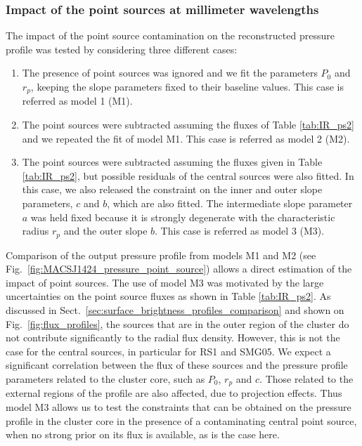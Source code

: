 \documentclass[twocolumn,traditabstract]{aa}
\begin{document}
\subsubsection{Impact of the point sources at millimeter wavelengths}
The impact of the point source contamination on the reconstructed pressure profile was tested by considering three different cases: 
\begin{enumerate}
\item The presence of point sources was ignored and we fit the parameters $P_0$ and $r_p$, keeping the slope parameters fixed to their baseline values. This case is referred as model 1 (M1).
\item The point sources were subtracted assuming the fluxes of Table \ref{tab:IR_ps2} and we repeated the fit of model M1. This case is referred as model 2 (M2).
\item The point sources were subtracted assuming the fluxes given in Table \ref{tab:IR_ps2}, but possible residuals of the central sources were also fitted. In this case, we also released the constraint on the inner and outer slope parameters, $c$ and $b$, which are also fitted. The intermediate slope parameter $a$ was held fixed because it is strongly degenerate with the characteristic radius $r_p$ and the outer slope $b$. This case is referred as model 3 (M3).
\end{enumerate}
Comparison of the output pressure profile from models M1 and M2 (see Fig.~\ref{fig:MACSJ1424_pressure_point_source}) allows a direct estimation of the impact of point sources. The use of model M3 was motivated by the large uncertainties on the point source fluxes as shown in Table \ref{tab:IR_ps2}. As discussed in Sect.~\ref{sec:surface_brightness_profiles_comparison} and shown on Fig.~\ref{fig:flux_profiles}, the sources that are in the outer region of the cluster do not contribute significantly to the radial flux density. However, this is not the case for the central sources, in particular for RS1 and SMG05. We expect a significant correlation between the flux of these sources and the pressure profile parameters related to the cluster core, such as $P_0$, $r_p$ and $c$. Those related to the external regions of the profile are also affected, due to projection effects. Thus model M3 allows us to test the constraints that can be obtained on the pressure profile in the cluster core in the presence of a contaminating central point source, when no strong prior on its flux is available, as is the case here.
\end{document}
